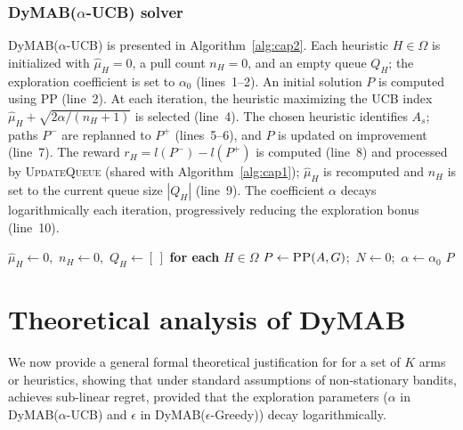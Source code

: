 \documentclass[review]{jair}
\begin{document}
\subsubsection{DyMAB($\alpha$-UCB) solver}
DyMAB($\alpha$-UCB) is presented in Algorithm~\ref{alg:cap2}. Each heuristic $H \in \Omega$ is initialized with $\hat{\mu}_H = 0$, a pull count $n_H = 0$, and an empty queue $Q_H$; the exploration coefficient is set to $\alpha_0$ (lines~1--2). An initial solution $P$ is computed using PP (line~2). At each iteration, the heuristic maximizing the UCB index $\hat{\mu}_H + \sqrt{2\alpha/(n_H+1)}$ is selected (line~4). The chosen heuristic identifies $A_s$; paths $P^-$ are replanned to $P^+$ (lines~5--6), and $P$ is updated on improvement (line~7). The reward $r_H = l(P^-) - l(P^+)$ is computed (line~8) and processed by \textsc{UpdateQueue} (shared with Algorithm~\ref{alg:cap1}); $\hat{\mu}_H$ is recomputed and $n_H$ is set to the current queue size $|Q_H|$ (line~9). The coefficient $\alpha$ decays logarithmically each iteration, progressively reducing the exploration bonus (line~10).
\begin{algorithm}[t]
\caption{DyMAB($\alpha$-UCB)}
\label{alg:cap2}
$\hat{\mu}_H \gets 0$,\ $n_H \gets 0$,\ $Q_H \gets [\,]$ \textbf{for each} $H \in \Omega$\;
$P \gets \textsc{PP}(A, G)$;\ $N \gets 0$;\ $\alpha \gets \alpha_0$\;
\Return $P$\;
\end{algorithm}

\section{Theoretical analysis of DyMAB}\label{sec:theory}
We now provide a general formal theoretical justification for  for a set of $K$ arms or heuristics, showing that under standard assumptions of non-stationary bandits,  achieves sub-linear regret, provided that the exploration parameters ($\alpha$ in DyMAB($\alpha$-UCB) and $\epsilon$ in  DyMAB($\epsilon$-Greedy)) decay logarithmically.
\end{document}
